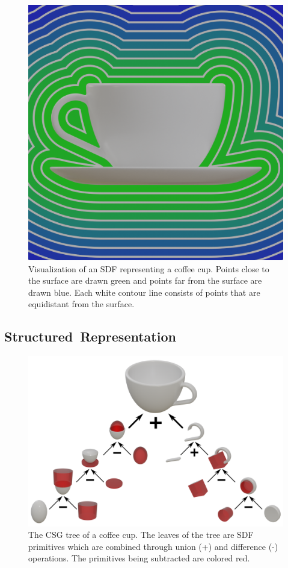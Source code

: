 \begin{figure}[ht]
	\centering
	\includegraphics[scale=0.2]{Images/SDF Cup}
	\caption{Visualization of an SDF representing a coffee cup. Points close to the surface are drawn green and points far from the surface are drawn blue. Each white contour line consists of points that are equidistant from the surface.}
	\label{fig:sdf_cup}
\end{figure}

\subsection{Structured~Representation}
\label{subsec:structured_representation}

\begin{figure}[ht]
	\centering
	\includegraphics[scale=0.5]{Images/CSG Cup}
	\caption{The CSG tree of a coffee cup. The leaves of the tree are SDF primitives which are combined through union (+) and difference (-) operations. The primitives being subtracted are colored red.}
	\label{fig:csg_cup}
\end{figure}


